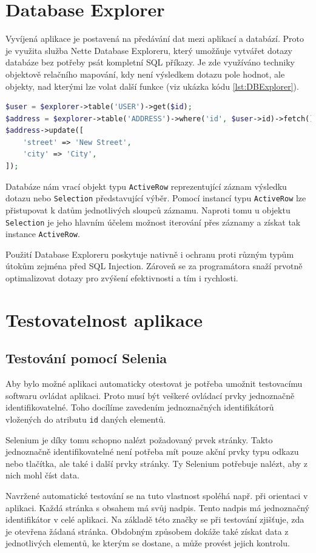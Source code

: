 \documentclass[czech,BP]{thesiskiv}
\begin{document}
		\section{Database Explorer}
		\par Vyvíjená aplikace je postavená na předávání dat mezi aplikací a databází. Proto je využita služba Nette Database Exploreru, který umožňuje vytvářet dotazy databáze bez potřeby psát kompletní SQL příkazy. Je zde využíváno techniky objektově relačního mapování, kdy není výsledkem dotazu pole hodnot, ale objekty, nad kterými lze volat další funkce (viz ukázka kódu \ref{lst:DBExplorer}).
		\begin{minipage}{\linewidth}
		\begin{lstlisting}[language=PHP, caption={Ukázka použití Nette Database Explorer},label={lst:DBExplorer}]
$user = $explorer->table('USER')->get($id);
$address = $explorer->table('ADDRESS')->where('id', $user->id)->fetch();
$address->update([
	'street' => 'New Street',
	'city' => 'City',	
]);
\end{lstlisting}
\end{minipage}
		\par Databáze nám vrací objekt typu \texttt{ActiveRow} reprezentující záznam výsledku dotazu nebo \texttt{Selection} představující výběr. Pomocí instancí typu \texttt{ActiveRow} lze přistupovat k datům jednotlivých sloupců záznamu. Naproti tomu u objektu \texttt{Selection} je jeho hlavním účelem možnost iterování přes záznamy a získat tak instance \texttt{ActiveRow}. 
		\par Použití Database Exploreru poskytuje nativně i ochranu proti různým typům útokům zejména před SQL Injection. Zároveň se za programátora snaží prvotně optimalizovat dotazy pro zvýšení efektivnosti a tím i rychlosti.
		
		\section{Testovatelnost aplikace}
		\label{sec:testovatelnost}
		\subsection{Testování pomocí Selenia}
		\par Aby bylo možné aplikaci automaticky otestovat je potřeba umožnit testovacímu softwaru ovládat aplikaci. Proto musí být veškeré ovládací prvky jednoznačně identifikovatelné. Toho docílíme zavedením jednoznačných identifikátorů vložených do atributu \texttt{id} daných elementů.
		\par Selenium je díky tomu schopno nalézt požadovaný prvek stránky. Takto jednoznačně identifikovatelné není potřeba mít pouze akční prvky typu odkazu nebo tlačítka, ale také i další prvky stránky. Ty Selenium potřebuje nalézt, aby z nich mohl číst data.
		\par Navržené automatické testování se na tuto vlastnost spoléhá např. při orientaci v aplikaci. Každá stránka s obsahem má svůj nadpis. Tento nadpis má jednoznačný identifikátor v celé aplikaci. Na základě této značky se při testování zjišťuje, zda je otevřena žádaná stránka. Obdobným způsobem dokáže také získat data z jednotlivých elementů, ke kterým se dostane, a může provést jejich kontrolu.
		
\end{document}

